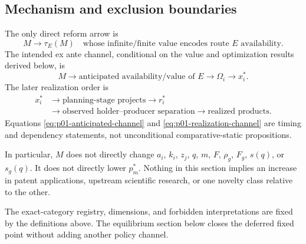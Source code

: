 \subsection{Mechanism and exclusion boundaries}
\label{subsec:p01-mechanism-boundary}

The only direct reform arrow is
\begin{equation}
  M\longrightarrow \tau_E(M)
  \quad\text{whose infinite/finite value encodes route }E\text{ availability}.
  \label{eq:p01-only-direct-policy-arrow}
\end{equation}
The intended ex ante channel, conditional on the value and optimization results
derived below, is
\begin{equation}
  M
  \longrightarrow
  \text{anticipated availability/value of }E
  \longrightarrow
  \Omega_i
  \longrightarrow
  x_i^*.
  \label{eq:p01-anticipated-channel}
\end{equation}
The later realization order is
\begin{equation}
  \begin{aligned}
    x_i^*
    &\longrightarrow
    \text{planning-stage projects}
    \longrightarrow r_i^* \\
    &\longrightarrow
    \text{observed holder--producer separation}
    \longrightarrow
    \text{realized products}.
  \end{aligned}
  \label{eq:p01-realization-channel}
\end{equation}
Equations \eqref{eq:p01-anticipated-channel} and
\eqref{eq:p01-realization-channel} are timing and dependency statements, not
unconditional comparative-static propositions.

In particular, \(M\) does not directly change \(a_i\), \(k_i\), \(z_j\),
\(q\), \(m\), \(F\), \(\rho_g\), \(F_g\), \(s(q)\), or \(s_g(q)\).  It does
not directly lower \(p_m^*\).  Nothing in this section implies an increase in
patent applications, upstream scientific research, or one novelty class
relative to the other.

The exact-category registry, dimensions, and forbidden interpretations are
fixed by the definitions above.  The equilibrium section below closes the
deferred fixed point without adding another policy channel.
